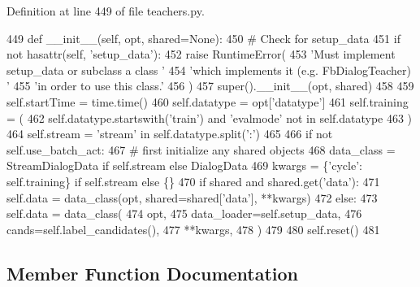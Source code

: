 Definition at line 449 of file teachers.\+py.


\begin{DoxyCode}
449     \textcolor{keyword}{def }\_\_init\_\_(self, opt, shared=None):
450         \textcolor{comment}{# Check for setup\_data}
451         \textcolor{keywordflow}{if} \textcolor{keywordflow}{not} hasattr(self, \textcolor{stringliteral}{'setup\_data'}):
452             \textcolor{keywordflow}{raise} RuntimeError(
453                 \textcolor{stringliteral}{'Must implement setup\_data or subclass a class '}
454                 \textcolor{stringliteral}{'which implements it (e.g. FbDialogTeacher) '}
455                 \textcolor{stringliteral}{'in order to use this class.'}
456             )
457         super().\_\_init\_\_(opt, shared)
458 
459         self.startTime = time.time()
460         self.datatype = opt[\textcolor{stringliteral}{'datatype'}]
461         self.training = (
462             self.datatype.startswith(\textcolor{stringliteral}{'train'}) \textcolor{keywordflow}{and} \textcolor{stringliteral}{'evalmode'} \textcolor{keywordflow}{not} \textcolor{keywordflow}{in} self.datatype
463         )
464         self.stream = \textcolor{stringliteral}{'stream'} \textcolor{keywordflow}{in} self.datatype.split(\textcolor{stringliteral}{':'})
465 
466         \textcolor{keywordflow}{if} \textcolor{keywordflow}{not} self.use\_batch\_act:
467             \textcolor{comment}{# first initialize any shared objects}
468             data\_class = StreamDialogData \textcolor{keywordflow}{if} self.stream \textcolor{keywordflow}{else} DialogData
469             kwargs = \{\textcolor{stringliteral}{'cycle'}: self.training\} \textcolor{keywordflow}{if} self.stream \textcolor{keywordflow}{else} \{\}
470             \textcolor{keywordflow}{if} shared \textcolor{keywordflow}{and} shared.get(\textcolor{stringliteral}{'data'}):
471                 self.data = data\_class(opt, shared=shared[\textcolor{stringliteral}{'data'}], **kwargs)
472             \textcolor{keywordflow}{else}:
473                 self.data = data\_class(
474                     opt,
475                     data\_loader=self.setup\_data,
476                     cands=self.label\_candidates(),
477                     **kwargs,
478                 )
479 
480         self.reset()
481 
\end{DoxyCode}


\subsection{Member Function Documentation}
\mbox{\label{classparlai_1_1core_1_1teachers_1_1DialogTeacher_a1988d984bf87370e9a9e58c9b8ca67a8}} 
